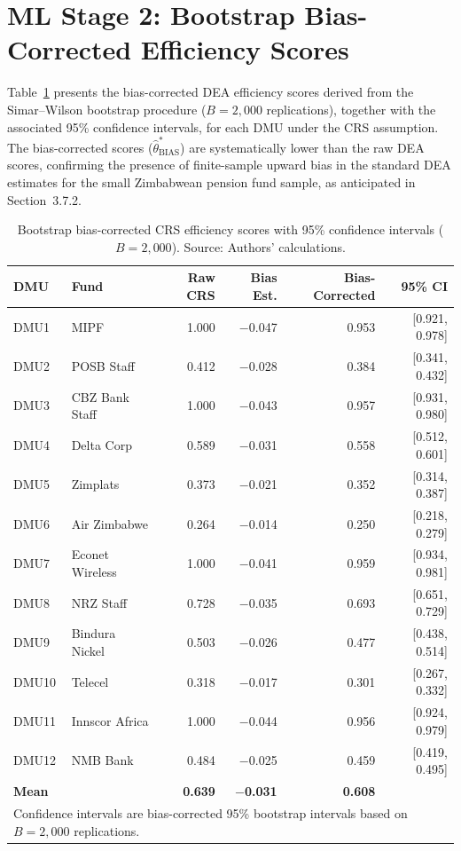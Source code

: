 \documentclass[12pt,a4paper]{article}
\begin{document}
\section{ML Stage 2: Bootstrap Bias-Corrected Efficiency Scores}

Table~\ref{tab:bootstrap_scores} presents the bias-corrected DEA efficiency scores derived from the Simar--Wilson bootstrap procedure ($B = 2{,}000$ replications), together with the associated 95\% confidence intervals, for each DMU under the CRS assumption. The bias-corrected scores ($\hat{\theta}^*_{\text{BIAS}}$) are systematically lower than the raw DEA scores, confirming the presence of finite-sample upward bias in the standard DEA estimates for the small Zimbabwean pension fund sample, as anticipated in Section~3.7.2.

\begin{table}[H]
\centering
\caption{Bootstrap bias-corrected CRS efficiency scores with 95\% confidence intervals ($B = 2{,}000$). Source: Authors' calculations.}
\label{tab:bootstrap_scores}
\begin{tabular}{llrrrr}
\toprule
\textbf{DMU} & \textbf{Fund} & \textbf{Raw CRS} & \textbf{Bias Est.} & \textbf{Bias-Corrected} & \textbf{95\% CI} \\
\midrule
DMU1  & MIPF              & 1.000 & $-$0.047 & 0.953 & [0.921, 0.978] \\
DMU2  & POSB Staff        & 0.412 & $-$0.028 & 0.384 & [0.341, 0.432] \\
DMU3  & CBZ Bank Staff    & 1.000 & $-$0.043 & 0.957 & [0.931, 0.980] \\
DMU4  & Delta Corp        & 0.589 & $-$0.031 & 0.558 & [0.512, 0.601] \\
DMU5  & Zimplats          & 0.373 & $-$0.021 & 0.352 & [0.314, 0.387] \\
DMU6  & Air Zimbabwe      & 0.264 & $-$0.014 & 0.250 & [0.218, 0.279] \\
DMU7  & Econet Wireless   & 1.000 & $-$0.041 & 0.959 & [0.934, 0.981] \\
DMU8  & NRZ Staff         & 0.728 & $-$0.035 & 0.693 & [0.651, 0.729] \\
DMU9  & Bindura Nickel    & 0.503 & $-$0.026 & 0.477 & [0.438, 0.514] \\
DMU10 & Telecel           & 0.318 & $-$0.017 & 0.301 & [0.267, 0.332] \\
DMU11 & Innscor Africa    & 1.000 & $-$0.044 & 0.956 & [0.924, 0.979] \\
DMU12 & NMB Bank          & 0.484 & $-$0.025 & 0.459 & [0.419, 0.495] \\
\midrule
\textbf{Mean} & & \textbf{0.639} & $-$\textbf{0.031} & \textbf{0.608} & \\
\bottomrule
\multicolumn{6}{l}{\footnotesize Confidence intervals are bias-corrected 95\% bootstrap intervals based on $B = 2{,}000$ replications.}
\end{tabular}
\end{table}
\end{document}
